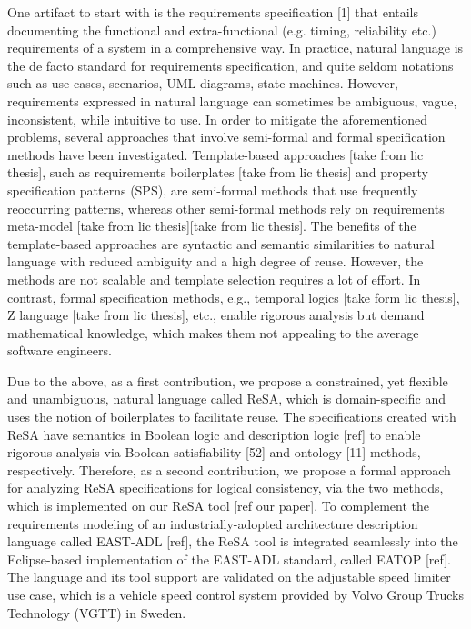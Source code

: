 One artifact to start with is the  requirements specification [1] that entails documenting the functional and extra-functional (e.g. timing, reliability etc.) requirements of a system in a comprehensive way. In practice, natural language
is the de facto standard for requirements specification, and quite seldom notations such as use cases, scenarios, UML diagrams, state machines. However, requirements expressed in natural language can sometimes be ambiguous,
vague, inconsistent, while intuitive to use. In order to mitigate the aforementioned problems, several approaches that involve semi-formal and formal specification methods have been investigated. Template-based approaches [take from lic thesis], such as requirements boilerplates [take from lic thesis] and property specification patterns (SPS), are semi-formal methods that use frequently reoccurring patterns, whereas other semi-formal methods rely on requirements meta-model [take from lic thesis][take from lic thesis]. The benefits of the template-based approaches are syntactic and semantic similarities to natural language with reduced ambiguity and a high degree of reuse. However, the methods are not scalable and template selection requires a lot of effort. In contrast, formal specification methods, e.g., temporal logics [take form lic thesis], Z language [take from lic thesis], etc., enable rigorous analysis but demand mathematical knowledge, which makes them not appealing to the average software engineers.
 
Due to the above, as a first contribution, we propose a constrained, yet flexible and unambiguous, natural language called ReSA, which is domain-specific and uses the notion of boilerplates to facilitate reuse. The specifications created with ReSA have semantics in Boolean logic and description logic [ref] to enable rigorous analysis via Boolean satisfiability [52] and ontology [11] methods, respectively. Therefore, as a second contribution, we propose a formal approach for analyzing ReSA specifications for logical consistency, via the two methods, which is implemented on our ReSA tool [ref our paper]. To complement the requirements modeling of an industrially-adopted architecture description language called EAST-ADL [ref], the ReSA tool is integrated seamlessly into the Eclipse-based implementation of the EAST-ADL standard, called EATOP [ref]. The language and its tool support are validated on the adjustable speed limiter use case, which is a vehicle speed control system provided by Volvo Group Trucks Technology (VGTT) in Sweden.
 
